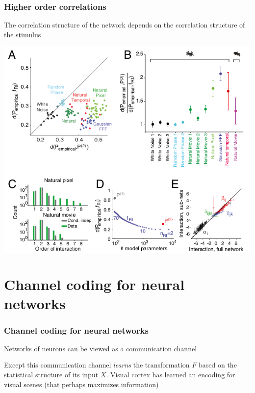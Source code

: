 \documentclass{beamer}
\begin{document}
\begin{frame}[plain]
\frametitle{Higher order correlations} 

The correlation structure of the network depends on the correlation structure of the stimulus

\begin{center}
\includegraphics[scale=0.35]{higher-order-interactions}
\end{center}


\end{frame}

\section{Channel coding for neural networks} 

\begin{frame}[plain]
\frametitle{Channel coding for neural networks} 

Networks of neurons can be viewed as a communication channel

Except this communication channel \emph{learns} the transformation $F$ based on the statistical structure of its input $X$. Visual cortex has learned an encoding for visual scenes (that perhaps maximizes information)

\end{frame}
\end{document}
